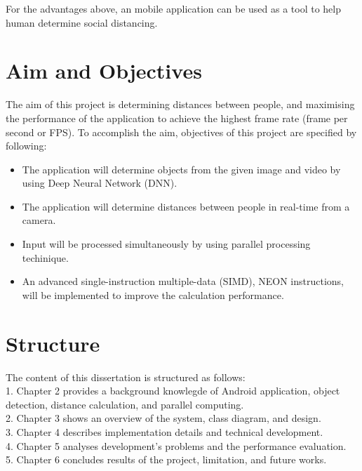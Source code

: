             For the advantages above, an mobile application can be used as a tool to help human determine social distancing.

    \section{Aim and Objectives}
        The aim of this project is determining distances between people,
        and maximising the performance of the application to achieve the highest frame rate (frame per second or FPS).
        To accomplish the aim, objectives of this project are specified by following:
        \begin{itemize}
            \setlength\itemsep{1em}
            \item The application will determine objects from the given image and video by using Deep Neural Network (DNN).
            \item The application will determine distances between people in real-time from a camera.
            \item Input will be processed simultaneously by using parallel processing techinique.
            \item An advanced single-instruction multiple-data (SIMD), NEON instructions, will be implemented to improve the calculation performance.
        \end{itemize}

    \section{Structure}
        The content of this dissertation is structured as follows: \\
        1.	Chapter 2 provides a background knowlegde of Android application, object detection, distance calculation, and parallel computing. \\
        2.	Chapter 3 shows an overview of the system, class diagram, and design.  \\
        3.	Chapter 4 describes implementation details and technical development. \\
        4.	Chapter 5 analyses development's problems and the performance evaluation. \\
        5.	Chapter 6 concludes results of the project, limitation, and future works.  \\
